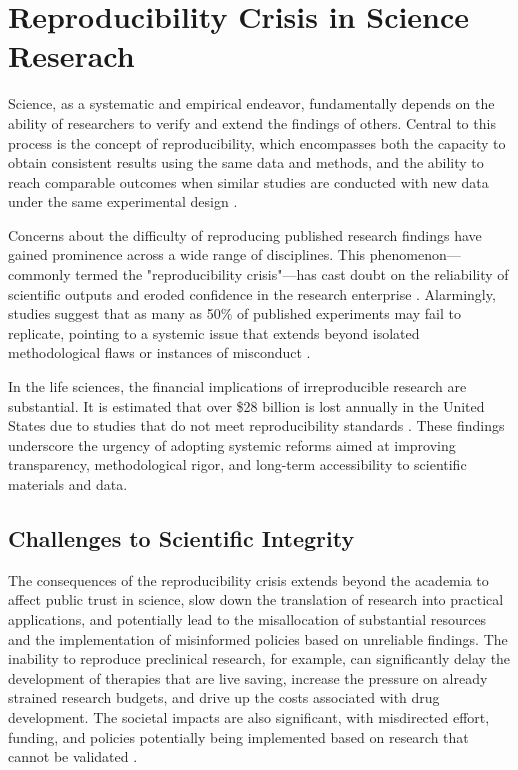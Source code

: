 \documentclass[final]{rc-book-2.14}
\begin{document}
\newpage

\section{Reproducibility Crisis in Science Reserach}
\label{chp:review:sec:rep_crisis}

Science, as a systematic and empirical endeavor, fundamentally depends on the ability of researchers to verify and extend the findings of others. Central to this process is the concept of reproducibility, which encompasses both the capacity to obtain consistent results using the same data and methods, and the ability to reach comparable outcomes when similar studies are conducted with new data under the same experimental design \cite{pellizzari_reproducibility_2017, committee_2019}.

Concerns about the difficulty of reproducing published research findings have gained prominence across a wide range of disciplines. This phenomenon—commonly termed the "reproducibility crisis"—has cast doubt on the reliability of scientific outputs and eroded confidence in the research enterprise \cite{baker2016reproducibility}. Alarmingly, studies suggest that as many as 50\% of published experiments may fail to replicate, pointing to a systemic issue that extends beyond isolated methodological flaws or instances of misconduct \cite{branch_reproducibility_2019}.

In the life sciences, the financial implications of irreproducible research are substantial. It is estimated that over \$28 billion is lost annually in the United States due to studies that do not meet reproducibility standards \cite{freedman2015economics}. These findings underscore the urgency of adopting systemic reforms aimed at improving transparency, methodological rigor, and long-term accessibility to scientific materials and data.


\subsection{Challenges to Scientific Integrity}

The consequences of the reproducibility crisis extends beyond the academia to affect public trust in science, slow down the translation of research into practical applications, and potentially lead to the misallocation of substantial resources and the implementation of misinformed policies based on unreliable findings. The inability to reproduce preclinical research, for example, can significantly delay the development of therapies that are live saving, increase the pressure on already strained research budgets, and drive up the costs associated with drug development. The societal impacts are also significant, with misdirected effort, funding, and policies potentially being implemented based on research that cannot be validated \cite{freedman2015economics}.
\end{document}
